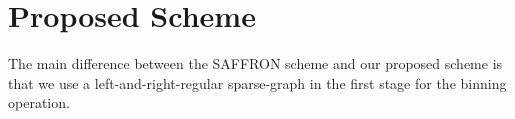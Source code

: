 \documentclass[conference,twocolumn]{IEEEtran}
\def\ceps{c_{\epsilon}}
\begin{document}
{%
%


\section{Proposed Scheme}
The main difference between the SAFFRON scheme and our proposed scheme is that we use a left-and-right-regular sparse-graph in the first stage for the binning operation.

}
\end{document}
